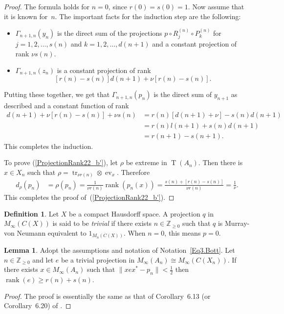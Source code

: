 \documentclass[10pt]{amsart}
\numberwithin{equation}{section}
\theoremstyle{definition}
\newtheorem{lem}[thm]{Lemma}
\newtheorem{dfn}[thm]{Definition}
\newcommand{\Nz}{{\mathbb{Z}}_{\geq 0}}
\newcommand{\ev}{{\operatorname{ev}}}
\newcommand{\rank}{{\operatorname{rank}}}
\newcommand{\T}{{\operatorname{T}}}
\newcommand{\tr}{{\operatorname{tr}}}
\begin{document}
%
\begin{proof}
The formula holds for $n = 0$,
since $r (0) = s (0) = 1$.
Now assume that it is known for~$n$.
The important facts for the induction step are the following:
\begin{itemize}
\item
$\Gamma_{n + 1, n} ( y_{n})$
is the direct sum of the projections
$p \circ R^{(n)}_{j} \circ P^{(n)}_{k}$
for $j = 1, 2, \ldots, s (n)$ and $k = 1, 2, \ldots, d (n + 1)$
and a constant projection of rank
$\nu s (n)$.
\item
$\Gamma_{n + 1, n} ( z_{n})$
is a constant projection of rank
\[
[r (n) - s (n)] d(n+1) + \nu [r(n) - s(n)].
\]
\end{itemize}
Putting these together,
we get that $\Gamma_{n + 1, n} (p_n)$ is the direct sum of
$y_{n + 1}$ as described
and a constant function of rank
\begin{align*}
[r (n) - s (n)] d(n+1) + \nu [r(n) - s(n)] + \nu s (n)
&=
r (n) [ d(n+1) + \nu ] - s(n) d(n+1)
\\&=
r (n) l(n+1) + s(n) d(n+1) 
\\&
= r(n+1) - s(n+1).
\end{align*}
This completes the induction.

To prove (\ref{ProjectionRank22_b'}),
let $\rho$ be extreme in $\T (A_{n})$.
Then there is $x \in X_{n}$  such that
$\rho = \tr_{\nu r (n)} \otimes \ev_{x}$.
Therefore
\begin{align*}
d_{\rho} (p_n)
&=
 \rho (p_n)
=
 \frac{1}{\nu r (n)} \rank (p_{n} (x))
=
\frac{s (n) + [r (n) - s (n)]}{\nu r (n)} 
=
\frac{1}{\nu}. 
\end{align*}
This completes the proof of~(\ref{ProjectionRank22_b'}).
\end{proof}
%
\begin{dfn}
Let $X$ be a  compact Hausdorff space.
A projection $q$ in $M_{\infty} ( C (X))$ is said to be \emph{trivial}
if there exists $n \in \Nz$ such that $q$ is Murray-von Neumann
equivalent to $1_{M_{n} (C (X))}$.
When $n = 0$, this means $p = 0$.
\end{dfn}
%
\begin{lem}\label{C_7808_BigRank2}
Adopt the assumptions and notation of Notation~\ref{Eq3.Bott}.
Let $n \in \Nz$ and let $e$ be a trivial projection in
$M_{\infty} (A_n) \cong M_{\infty} (C (X_n) )$.
If there exists $x \in M_{\infty} (A_n)$
such that $\| x e x^* - p_{n} \| < \frac{1}{2}$ then
$\rank (e) \geq  r (n) + s (n)$.
\end{lem}
%
\begin{proof}
The proof is essentially the same as that of
Corollary~6.13 (or Corollary~6.20)  of \cite{AGP19}. 
\end{proof}
\end{document}
